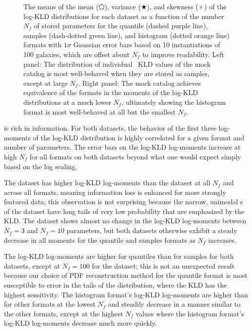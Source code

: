 \begin{figure}
\begin{center}
		\caption{
			The means of the mean ($\pentagon$), variance ($\bigstar$), and skewness 
			($\APLstar$) of the log-KLD distributions for each dataset as a function of the 
			number $N_{f}$ of stored parameters for the quantile (dashed purple line), 
			samples (dash-dotted green line), and histogram (dotted orange line) formats 
			with $1\sigma$ Gaussian error bars based on 10 instantiations of 100 galaxies, 
			which are offset about $N_{f}$ to improve readability.
			Left panel: The distribution of individual \pz\ KLD values of the \mgdata 
			mock catalog is most well-behaved when they are stored as samples, except at 
			large $N_{f}$.
			Right panel: The \ssdata mock catalog achieves equivalence of the formats 
			in the moments of the log-KLD distributions at a much lower $N_{f}$, ultimately 
			showing the histogram format is most well-behaved at all but the smallest 
			$N_{f}$.
			}
	\end{center}
\end{figure}

 is rich in information.
For both datasets, the behavior of the first three log-moments of the log-KLD 
distribution is highly correlated for a given format and number of parameters.
The error bars on the log-KLD log-moments increase at high $N_{f}$ for all 
formats on both datasets beyond what one would expect simply based on the log 
scaling.

The \mgdata dataset has higher log-KLD log-moments than the \ssdata dataset at 
all $N_{f}$ and across all formats, meaning information loss is enhanced for 
more strongly featured data; this observation is not surprising because the 
narrow, unimodal \pz s of the \mgdata dataset have long tails of very low 
probability that are emphasized by the KLD.
The \ssdata dataset shows almost no change in the log-KLD log-moments between 
$N_{f}=3$ and $N_{f}=10$ parameters, but both datasets otherwise exhibit a 
steady decrease in all moments for the quantile and samples formats as $N_{f}$ 
increases.

The log-KLD log-moments are higher for quantiles than for samples for both 
datasets, except at $N_{f}=100$ for the \mgdata dataset; this is not an 
unexpected result because our choice of PDF reconstruction method for the 
quantile format is most susceptible to error in the tails of the distribution, 
where the KLD has the highest sensitivity.
The histogram format's log-KLD log-moments are higher than for other formats at 
the lowest $N_{f}$ and steadily decrease in a manner similar to the other 
formats, except at the highest $N_{f}$ values where the histogram format's 
log-KLD log-moments decrease much more quickly.

